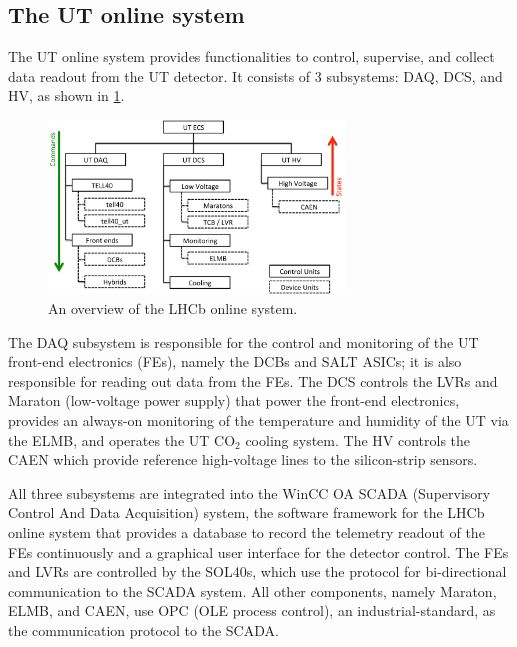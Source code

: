 \subsection{The UT online system}
\label{online-ut}


The UT online system provides functionalities to control, supervise,
and collect data readout from the UT detector.
It consists of 3 subsystems: DAQ, DCS, and HV, as shown in
\cref{fig:ut-online-system}.

\begin{figure}[!htb]
    \centering
    \includegraphics[width=0.7\textwidth]{figs-ut-upgrade/online/ut_online_sys.pdf}
    \caption{
        An overview of the LHCb online system.
    }
    \label{fig:ut-online-system}
\end{figure}

The DAQ subsystem is responsible for the control and monitoring of the UT
front-end electronics (FEs),
namely the DCBs and SALT ASICs;
it is also responsible for reading out data from the FEs.
The DCS controls the LVRs and Maraton (low-voltage power supply) that power the
front-end electronics,
provides an always-on monitoring of the temperature and humidity of the UT via
the ELMB,
and operates the UT $\text{CO}_2$ cooling system.
The HV controls the CAEN which provide reference high-voltage lines to the
silicon-strip sensors.

All three subsystems are integrated into the WinCC OA SCADA
(Supervisory Control And Data Acquisition) system,
the software framework for the LHCb online system that provides a database to
record the telemetry readout of the FEs
continuously and a graphical user interface for the detector control.
The FEs and LVRs are controlled by the SOL40s,
which use the \dim protocol for bi-directional communication to the SCADA
system.
All other components, namely Maraton, ELMB, and CAEN,
use OPC (OLE process control),
an industrial-standard, as the communication protocol to the SCADA.

